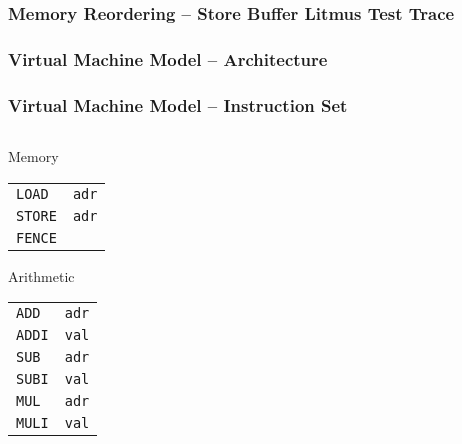 \documentclass{beamer}
\newcommand{\lstASM}[1]{\lstinline[style=asm]{#1}}
\begin{document}
\begin{frame}
  \frametitle{Memory Reordering -- Store Buffer Litmus Test Trace}
  \centering
  
\end{frame}

\begin{frame}
  \frametitle{Virtual Machine Model -- Architecture}
  \centering
  \hspace{-.8cm}
  \scalebox{.8}{}
\end{frame}

\begin{frame}[fragile]
  \frametitle{Virtual Machine Model -- Instruction Set}
  \vspace*{-.2cm}
  \begin{columns}
    \begin{column}{0.2\textwidth}
      \begin{textbox}{Memory}\color{black}
        \begin{tabular}{ll}
          \lstASM{LOAD} & \lstASM{adr} \\
          \lstASM{STORE} & \lstASM{adr} \\
          \lstASM{FENCE} \\
        \end{tabular}
      \end{textbox}
      \begin{textbox}{Arithmetic}\color{black}
        \begin{tabular}{ll}
          \lstASM{ADD} & \lstASM{adr} \\
          \lstASM{ADDI} & \lstASM{val} \\
          \lstASM{SUB} & \lstASM{adr} \\
          \lstASM{SUBI} & \lstASM{val} \\
          \lstASM{MUL} & \lstASM{adr} \\
          \lstASM{MULI} & \lstASM{val} \\
        \end{tabular}
      \end{textbox}
    \end{column}


\end{columns}
\end{frame}
\end{document}
